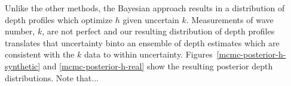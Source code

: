 Unlike the other methods, the Bayesian approach results in a distribution of depth profiles which optimize $h$ given uncertain $k$. Measurements of wave number, $k$, are not perfect and our resulting distribution of depth profiles translates that uncertainty binto an ensemble of depth estimates which are consistent with the $k$ data to within uncertainty. Figures~\ref{mcmc-posterior-h-synthetic} and \ref{mcmc-posterior-h-real} show the resulting posterior depth distributions. Note that...






